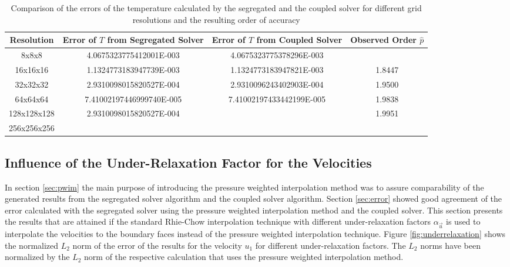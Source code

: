 \begin{table}[h!]\centering
{}
  \begin{tabular}{cccc}\toprule
    Resolution & Error of \(T\) from Segregated Solver & Error of \(T\) from Coupled Solver & Observed Order \(\hat{p}\) \\
    \midrule
    \rowcolor{black!20} 8x8x8       & 4.0675323775412001E-003   & 4.0675323775378296E-003  &        \\%
    \rowcolor{black!00} 16x16x16    & 1.1324773183947739E-003   & 1.1324773183947821E-003  & 1.8447 \\%
    \rowcolor{black!20} 32x32x32    & 2.9310098015820527E-004   & 2.9310096243402903E-004  & 1.9500 \\%
    \rowcolor{black!00} 64x64x64    & 7.41002197446999740E-005  & 7.41002197433442199E-005 & 1.9838 \\%
    \rowcolor{black!20} 128x128x128 & 2.9310098015820527E-004   &                          & 1.9951 \\%
    \rowcolor{black!00} 256x256x256 &                           &                          &        \\%
  \end{tabular}
  \caption{Comparison of the errors of the temperature calculated by the segregated and the coupled solver for different grid resolutions and the resulting order of accuracy}
\end{table}

\subsection{Influence of the Under-Relaxation Factor for the Velocities}
\label{sec:independence}

In section \ref{sec:pwim} the main purpose of introducing the pressure weighted interpolation method was to assure comparability of the generated results from the segregated solver algorithm and the coupled solver algorithm. Section \ref{sec:error} showed good agreement of the error calculated with the segregated solver using the pressure weighted interpolation method and the coupled solver. This section presents the results that are attained if the standard Rhie-Chow interpolation technique with different under-relaxation factors \(\alpha_\vec{u}\) is used to interpolate the velocities to the boundary faces instead of the pressure weighted interpolation technique. Figure \ref{fig:underrelaxation} shows the normalized \(L_2\) norm of the error of the results for the velocity \(u_1\) for different under-relaxation factors. The \(L_2\) norms have been normalized by the \(L_2\) norm of the respective calculation that uses the pressure weighted interpolation method. 

